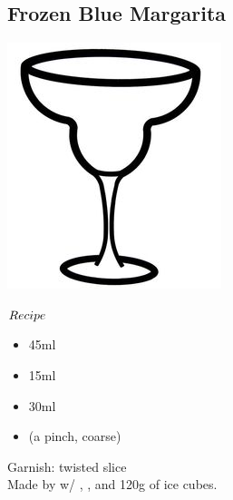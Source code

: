 \subsection{Frozen Blue Margarita}
\vspace{-7mm}
\hspace{58mm}
\includegraphics[scale=.05]{cocktail_glass_snow.jpg}
\vspace{2.5mm}
\begin{itembox}[l]{\boldmath $Recipe$}
\begin{itemize}
\setlength{\parskip}{0cm}
\setlength{\itemsep}{0cm}
\item \teq 45ml
\item \bc 15ml
\item \limj 30ml
\item \salt (a pinch, coarse)
\end{itemize}
\vspace{-4mm}
Garnish: \lime twisted slice\\
Made by \blend w/ \teq
\hspace{-1mm}, \wc
\hspace{-1mm}, \limj and 120g of ice cubes.
\end{itembox}
